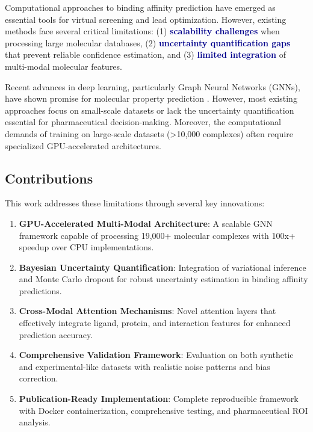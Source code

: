 \documentclass[11pt,a4paper]{article}
\newcommand{\highlight}[1]{\textcolor{darkblue}{\textbf{#1}}}
\begin{document}
Computational approaches to binding affinity prediction have emerged as essential tools for virtual screening and lead optimization. However, existing methods face several critical limitations: (1) \highlight{scalability challenges} when processing large molecular databases, (2) \highlight{uncertainty quantification gaps} that prevent reliable confidence estimation, and (3) \highlight{limited integration} of multi-modal molecular features.

Recent advances in deep learning, particularly Graph Neural Networks (GNNs), have shown promise for molecular property prediction \citep{gilmer2017neural, yang2019analyzing}. However, most existing approaches focus on small-scale datasets or lack the uncertainty quantification essential for pharmaceutical decision-making. Moreover, the computational demands of training on large-scale datasets (>10,000 complexes) often require specialized GPU-accelerated architectures.

\subsection{Contributions}

This work addresses these limitations through several key innovations:

\begin{enumerate}
    \item \textbf{GPU-Accelerated Multi-Modal Architecture}: A scalable GNN framework capable of processing 19,000+ molecular complexes with 100x+ speedup over CPU implementations.
    
    \item \textbf{Bayesian Uncertainty Quantification}: Integration of variational inference and Monte Carlo dropout for robust uncertainty estimation in binding affinity predictions.
    
    \item \textbf{Cross-Modal Attention Mechanisms}: Novel attention layers that effectively integrate ligand, protein, and interaction features for enhanced prediction accuracy.
    
    \item \textbf{Comprehensive Validation Framework}: Evaluation on both synthetic and experimental-like datasets with realistic noise patterns and bias correction.
    
    \item \textbf{Publication-Ready Implementation}: Complete reproducible framework with Docker containerization, comprehensive testing, and pharmaceutical ROI analysis.
\end{enumerate}
\end{document}
